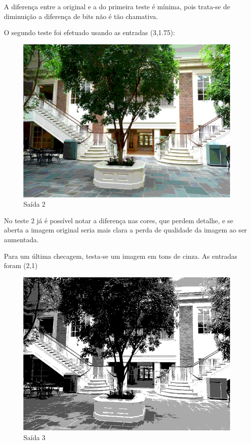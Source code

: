 \documentclass[conference]{IEEEtran}
\begin{document}
A diferença entre a original e a do primeira teste é mínima, pois
trata-se de diminuição a diferença de bits não é tão chamativa.

O segundo teste foi efetuado usando as entradas (3,1.75):
\begin{figure}[h]
    \centering
    \includegraphics[scale=0.20]{Figs/saida2.png}
    \caption{Saída 2}
    \label{fig2}
\end{figure}

No teste 2 já é possível notar a diferença nas cores, que perdem detalhe,
e se aberta a imagem original seria mais clara a perda de qualidade
da imagem ao ser aumentada.

Para um última checagem, testa-se um imagem em tons de cinza. As entradas
foram (2,1)

\begin{figure}[h]
    \centering
    \includegraphics[scale=0.35]{Figs/saida3.png}
    \caption{Saída 3}
    \label{fig2}
\end{figure}
\end{document}
